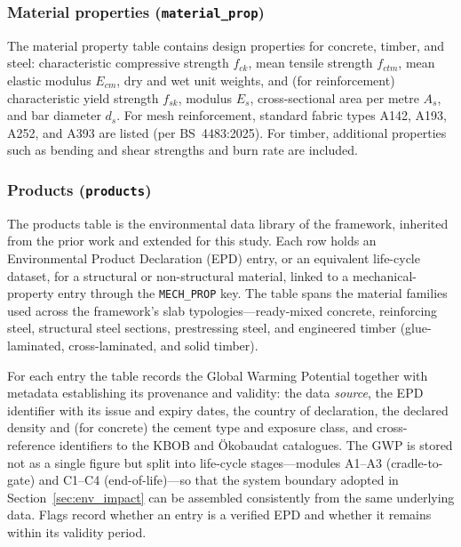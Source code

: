 \subsubsection*{Material properties (\texttt{material\_prop})}
The material property table contains design properties for concrete, timber, and steel: characteristic compressive strength $f_{ck}$, mean tensile strength $f_{ctm}$, mean elastic modulus $E_{cm}$, dry and wet unit weights, and (for reinforcement) characteristic yield strength $f_{sk}$, modulus $E_s$, cross-sectional area per metre $A_s$, and bar diameter $d_s$. For mesh reinforcement, standard fabric types A142, A193, A252, and A393 are listed (per BS~4483:2025). For timber, additional properties such as bending and shear strengths and burn rate are included.

\subsubsection*{Products (\texttt{products})}
The products table is the environmental data library of the framework, inherited from the prior work and extended for this study. Each row holds an Environmental Product Declaration (EPD) entry, or an equivalent life-cycle dataset, for a structural or non-structural material, linked to a mechanical-property entry through the \texttt{MECH\_PROP} key. The table spans the material families used across the framework's slab typologies---ready-mixed concrete, reinforcing steel, structural steel sections, prestressing steel, and engineered timber (glue-laminated, cross-laminated, and solid timber).

For each entry the table records the Global Warming Potential together with metadata establishing its provenance and validity: the data \emph{source}, the EPD identifier with its issue and expiry dates, the country of declaration, the declared density and (for concrete) the cement type and exposure class, and cross-reference identifiers to the KBOB and Ökobaudat catalogues. The GWP is stored not as a single figure but split into life-cycle stages---modules A1--A3 (cradle-to-gate) and C1--C4 (end-of-life)---so that the system boundary adopted in Section~\ref{sec:env_impact} can be assembled consistently from the same underlying data. Flags record whether an entry is a verified EPD and whether it remains within its validity period.

